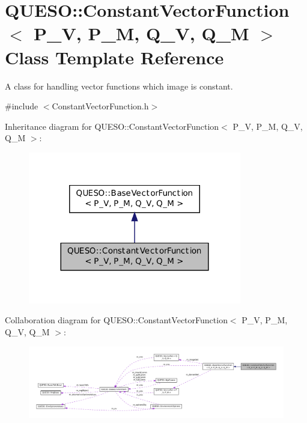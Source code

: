 \hypertarget{class_q_u_e_s_o_1_1_constant_vector_function}{\section{Q\-U\-E\-S\-O\-:\-:Constant\-Vector\-Function$<$ P\-\_\-\-V, P\-\_\-\-M, Q\-\_\-\-V, Q\-\_\-\-M $>$ Class Template Reference}
\label{class_q_u_e_s_o_1_1_constant_vector_function}
}


A class for handling vector functions which image is constant.  




{\ttfamily \#include $<$Constant\-Vector\-Function.\-h$>$}



Inheritance diagram for Q\-U\-E\-S\-O\-:\-:Constant\-Vector\-Function$<$ P\-\_\-\-V, P\-\_\-\-M, Q\-\_\-\-V, Q\-\_\-\-M $>$\-:
\nopagebreak
\begin{figure}[H]
\begin{center}
\leavevmode
\includegraphics[width=264pt]{class_q_u_e_s_o_1_1_constant_vector_function__inherit__graph}
\end{center}
\end{figure}


Collaboration diagram for Q\-U\-E\-S\-O\-:\-:Constant\-Vector\-Function$<$ P\-\_\-\-V, P\-\_\-\-M, Q\-\_\-\-V, Q\-\_\-\-M $>$\-:
\nopagebreak
\begin{figure}[H]
\begin{center}
\leavevmode
\includegraphics[width=350pt]{class_q_u_e_s_o_1_1_constant_vector_function__coll__graph}
\end{center}
\end{figure}
